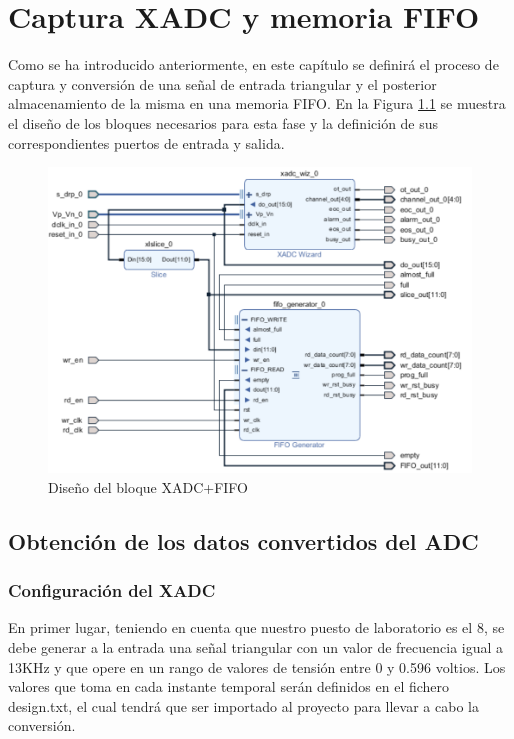 \chapter{Captura XADC y memoria FIFO}
\label{section:xadc_fifo}


Como se ha introducido anteriormente, en este capítulo se definirá el proceso de captura y conversión de una señal de entrada triangular y el posterior almacenamiento de la misma en una memoria FIFO. En la Figura \ref{fig:xadc_fifo} se muestra el diseño de los bloques necesarios para esta fase y la definición de sus correspondientes puertos de entrada y salida.

\vspace{3mm}

\begin{figure}[h]
    \centering
    \includegraphics[width=1\textwidth]{img/diseno/xadc_fifo.PNG}
    \caption{Diseño del bloque XADC+FIFO}
    \label{fig:xadc_fifo}
\end{figure}
    
\vspace{3mm}

\section{Obtención de los datos convertidos del ADC}

\subsection{Configuración del XADC}

En primer lugar, teniendo en cuenta que nuestro puesto de laboratorio es el 8, se debe generar a la entrada una señal triangular con un valor de frecuencia igual a 13KHz y que opere en un rango de valores de tensión entre 0 y 0.596 voltios. Los valores que toma en cada instante temporal serán definidos en el fichero design.txt, el cual tendrá que ser importado al proyecto para llevar a cabo la conversión.


